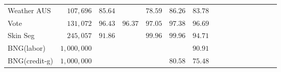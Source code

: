 \begin{table}
\begin{tabular}{lrrrrrrrrrrrrrrr}
		\multirow{1}{*}{Weather AUS} & \multirow{1}{*}{ $ 107,696 $ }  &
		$ 85.64 $  & \textemdash &  $ 78.59 $  &  $ \mathbf{86.26} $  &  $ 83.78 $  \\
		\multirow{1}{*}{Vote} & \multirow{1}{*}{ $ 131,072 $ }  &
		$ 96.43 $  &  $ 96.37 $  &  $ 97.05 $  &  $ \mathbf{97.38} $  &  $ 96.69 $  \\
		\multirow{1}{*}{Skin Seg} & \multirow{1}{*}{ $ 245,057 $ }  &
		$ 91.86 $  & \textemdash &  $ \mathbf{99.96} $  &  $ \mathbf{99.96} $  &  $ 94.71 $  \\
		\multirow{1}{*}{BNG(labor)} & \multirow{1}{*}{ $ 1,000,000 $ }  &
		\textemdash & \textemdash & \textemdash & \textemdash &  $ \mathbf{90.91} $  \\
		\multirow{1}{*}{BNG(credit-g)} & \multirow{1}{*}{ $ 1,000,000 $ }  &
		\textemdash & \textemdash & \textemdash &  $ \mathbf{80.58} $  &  $ 75.48 $  \\
		\bottomrule
		
		
		
	\end{tabular}
	
\end{table}


